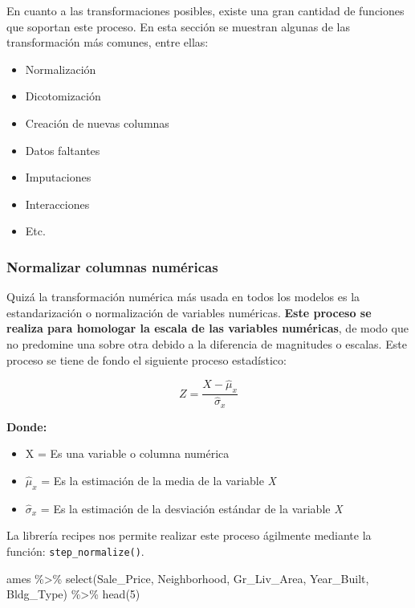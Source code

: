 \documentclass[
]{book}
\newenvironment{Shaded}{\begin{snugshade}}{\end{snugshade}}
\newcommand{\DecValTok}[1]{\textcolor[rgb]{0.00,0.00,0.81}{#1}}
\newcommand{\FunctionTok}[1]{\textcolor[rgb]{0.00,0.00,0.00}{#1}}
\newcommand{\NormalTok}[1]{#1}
\newcommand{\SpecialCharTok}[1]{\textcolor[rgb]{0.00,0.00,0.00}{#1}}
\providecommand{\tightlist}{%
  \setlength{\itemsep}{0pt}\setlength{\parskip}{0pt}}
\begin{document}
En cuanto a las transformaciones posibles, existe una gran cantidad de funciones que soportan este proceso. En esta sección se muestran algunas de las transformación más comunes, entre ellas:

\begin{itemize}
\tightlist
\item
  Normalización
\item
  Dicotomización
\item
  Creación de nuevas columnas
\item
  Datos faltantes
\item
  Imputaciones
\item
  Interacciones
\item
  Etc.
\end{itemize}

\hypertarget{normalizar-columnas-numuxe9ricas}{%
\subsubsection{Normalizar columnas numéricas}\label{normalizar-columnas-numuxe9ricas}}

Quizá la transformación numérica más usada en todos los modelos es la estandarización o normalización de variables numéricas. \textbf{Este proceso se realiza para homologar la escala de las variables numéricas}, de modo que no predomine una sobre otra debido a la diferencia de magnitudes o escalas. Este proceso se tiene de fondo el siguiente proceso estadístico:

\[Z=\frac{X-\hat{\mu}_x}{\hat{\sigma}_x}\]

\textbf{Donde:}

\begin{itemize}
\item
  X = Es una variable o columna numérica
\item
  \(\hat{\mu}_x\) = Es la estimación de la media de la variable \emph{X}
\item
  \(\hat{\sigma}_x\) = Es la estimación de la desviación estándar de la variable \emph{X}
\end{itemize}

La librería recipes nos permite realizar este proceso ágilmente mediante la función: \texttt{step\_normalize()}.

\begin{Shaded}
\begin{Highlighting}[]
\NormalTok{ames }\SpecialCharTok{\%\textgreater{}\%} \FunctionTok{select}\NormalTok{(Sale\_Price, Neighborhood, Gr\_Liv\_Area, Year\_Built, Bldg\_Type) }\SpecialCharTok{\%\textgreater{}\%} 
  \FunctionTok{head}\NormalTok{(}\DecValTok{5}\NormalTok{)}
\end{Highlighting}
\end{Shaded}
\end{document}
